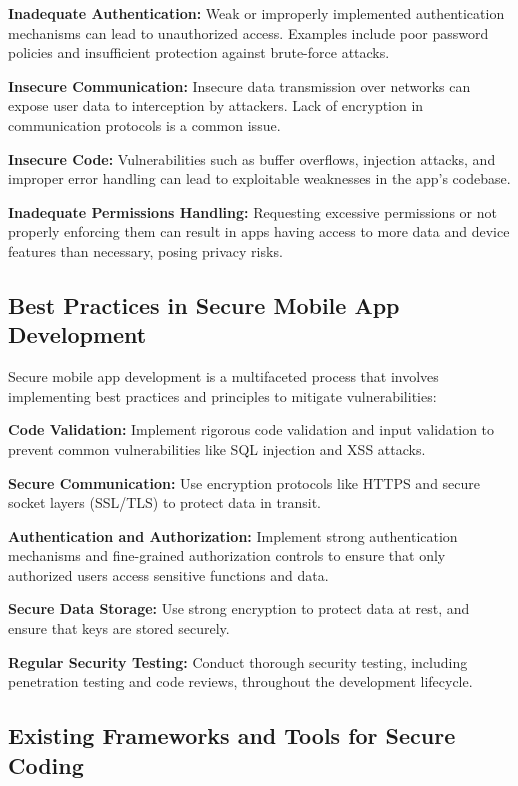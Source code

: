 \documentclass[conference]{IEEEtran}
\begin{document}
\textbf{Inadequate Authentication:} Weak or improperly implemented authentication mechanisms can lead to unauthorized access. Examples include poor password policies and insufficient protection against brute-force attacks.

\textbf{Insecure Communication:} Insecure data transmission over networks can expose user data to interception by attackers. Lack of encryption in communication protocols is a common issue.

\textbf{Insecure Code:} Vulnerabilities such as buffer overflows, injection attacks, and improper error handling can lead to exploitable weaknesses in the app's codebase.

\textbf{Inadequate Permissions Handling:} Requesting excessive permissions or not properly enforcing them can result in apps having access to more data and device features than necessary, posing privacy risks.

\subsection{Best Practices in Secure Mobile App Development}

Secure mobile app development is a multifaceted process that involves implementing best practices and principles to mitigate vulnerabilities:

\textbf{Code Validation:} Implement rigorous code validation and input validation to prevent common vulnerabilities like SQL injection and XSS attacks.

\textbf{Secure Communication:} Use encryption protocols like HTTPS and secure socket layers (SSL/TLS) to protect data in transit.

\textbf{Authentication and Authorization:} Implement strong authentication mechanisms and fine-grained authorization controls to ensure that only authorized users access sensitive functions and data.

\textbf{Secure Data Storage:} Use strong encryption to protect data at rest, and ensure that keys are stored securely.

\textbf{Regular Security Testing:} Conduct thorough security testing, including penetration testing and code reviews, throughout the development lifecycle.

\subsection{Existing Frameworks and Tools for Secure Coding}
\end{document}
